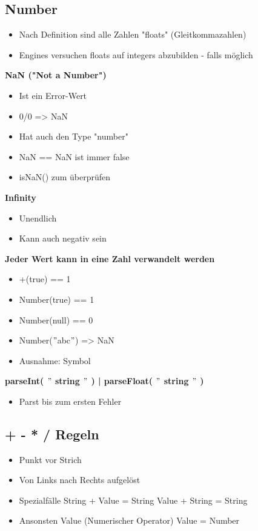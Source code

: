 \documentclass[a4paper, landscape, 8pt]{scrartcl}
\begin{document}
\begin{multicols*}{4}
        \subsection{Number}
        \begin{itemize}
            \item Nach Definition sind alle Zahlen "floats" (Gleitkommazahlen)
            \item Engines versuchen floats auf integers abzubilden - falls möglich
        \end{itemize}
        \textbf{NaN ("Not a Number")}
        \begin{itemize}
            \item Ist ein Error-Wert
            \item 0/0 => NaN
            \item Hat auch den Type "number"
            \item NaN == NaN ist immer false
            \item isNaN() zum überprüfen
        \end{itemize}
        \textbf{Infinity}
        \begin{itemize}
            \item Unendlich
            \item Kann auch negativ sein
        \end{itemize}
        \textbf{Jeder Wert kann in eine Zahl verwandelt werden}
        \begin{itemize}
            \item +(true) == 1
            \item Number(true) == 1
            \item Number(null) == 0
            \item Number(\("\)abc\("\)) => NaN
            \item Ausnahme: Symbol
        \end{itemize}
        \textbf{parseInt( \("\) string \("\) ) | parseFloat( \("\) string \("\) )}
        \begin{itemize}
            \item Parst bis zum ersten Fehler
        \end{itemize}

        \subsection{+ - * / Regeln}
        \begin{itemize}
            \item Punkt vor Strich
            \item Von Links nach Rechts aufgelöst
            \item Spezialfälle
            \subitem String + Value = String
            \subitem Value + String = String
            \item Ansonsten
            \subitem Value (Numerischer Operator) Value = Number
        \end{itemize}


\end{multicols*}
\end{document}
